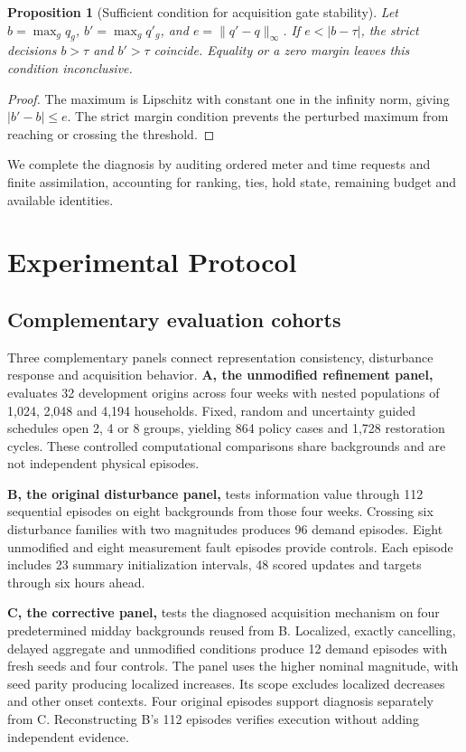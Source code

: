 \documentclass[conference]{IEEEtran}
\newtheorem{proposition}{Proposition}
\begin{document}
\begin{proposition}[Sufficient condition for acquisition gate stability]
Let $b=\max_gq_g$, $b'=\max_gq'_g$, and $e=\|q'-q\|_\infty$. If $e<|b-\tau|$, the strict decisions $b>\tau$ and $b'>\tau$ coincide. Equality or a zero margin leaves this condition inconclusive.
\end{proposition}
\begin{proof}
The maximum is Lipschitz with constant one in the infinity norm, giving $|b'-b|\le e$. The strict margin condition prevents the perturbed maximum from reaching or crossing the threshold.
\end{proof}

We complete the diagnosis by auditing ordered meter and time requests and finite assimilation, accounting for ranking, ties, hold state, remaining budget and available identities.









\section{Experimental Protocol}
\subsection{Complementary evaluation cohorts}
Three complementary panels connect representation consistency, disturbance response and acquisition behavior. \textbf{A, the unmodified refinement panel,} evaluates 32 development origins across four weeks with nested populations of 1,024, 2,048 and 4,194 households. Fixed, random and uncertainty guided schedules open 2, 4 or 8 groups, yielding 864 policy cases and 1,728 restoration cycles. These controlled computational comparisons share backgrounds and are not independent physical episodes.

\textbf{B, the original disturbance panel,} tests information value through 112 sequential episodes on eight backgrounds from those four weeks. Crossing six disturbance families with two magnitudes produces 96 demand episodes. Eight unmodified and eight measurement fault episodes provide controls. Each episode includes 23 summary initialization intervals, 48 scored updates and targets through six hours ahead.

\textbf{C, the corrective panel,} tests the diagnosed acquisition mechanism on four predetermined midday backgrounds reused from B. Localized, exactly cancelling, delayed aggregate and unmodified conditions produce 12 demand episodes with fresh seeds and four controls. The panel uses the higher nominal magnitude, with seed parity producing localized increases. Its scope excludes localized decreases and other onset contexts. Four original episodes support diagnosis separately from C. Reconstructing B's 112 episodes verifies execution without adding independent evidence.
\end{document}

